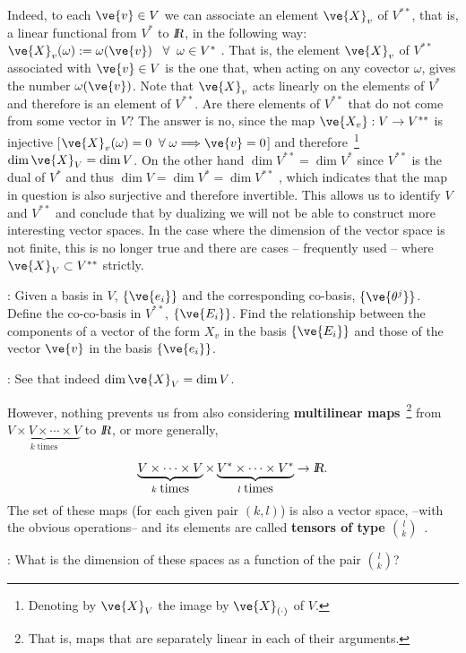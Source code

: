 Indeed, to each $\ve{v}\in V$ we can associate an element $\ve{
X}_v$ of
$V^{**}$, that is, a linear functional from $V^*$ to $\mbox{\sl {l$\!\!\!\;\:\!$R}}$, in the
following way: $\ve{X}_v(\omega):=\omega(\ve{v}) \;\;\;\forall
\;\;\omega\in V^{*}$ . That is, the element $\ve{X}_v$ of $V^{**}$
associated with $\ve{ v}\in V$ is the one that, when acting on any
covector $\omega$, gives the number $\omega (\ve{v})$. Note that $\ve{X}_v$ acts
linearly on the elements of $V^*$ and therefore is an element
of $V^{**}$. Are there elements of $V^{**}$ that do not come from some
vector in $V$? 
The answer is no, since the map  $\ve{X_v}:V\to V^{**}$ is
injective [$\ve{X}_v(\omega)=0\;\;\forall \; \omega\Longrightarrow \ve{v}=0$] and
therefore~\footnote{Denoting by $\ve{X}_V$ the image by $\ve{X}_{(\cdot)}$ 
of $V$.} $\dim \ve{X}_V = \dim V$.
On the other hand $\dim V^{**} = \dim V^*$ since $V^{**}$ is the dual of $V^*$ and thus 
$\dim V = \dim V^* = \dim V^{**}$ , which indicates that the map in question is also 
surjective and therefore invertible.
This allows us to identify
$V$ and $V^{**}$ and conclude that by dualizing we will not be able
to construct more interesting vector spaces. In the case where the dimension of the vector space is not finite, this is no longer true and there are cases -- frequently used -- where $\ve{X}_V \subset V^{**}$ strictly.
\espa

\ejer: Given a basis in $V$, $\{\ve{e_{i}}\}$ and the corresponding co-basis, $\{\ve{\theta^{j}}\}$.
Define the co-co-basis in $V^{**}$, $\{\ve{E_{i}}\}$. 
Find the relationship between the components of a vector of the form $X_{v}$ in the basis $\{\ve{E_{i}}\}$ and 
those of the vector $\ve{v}$ in the basis $\{\ve{e_{i}}\}$.

\ejer: See that indeed $\dim \ve{X}_V = \dim V$.

However, nothing prevents us from also considering 
{\bf multilinear maps}~\footnote{That is, maps that are separately linear in each 
of their arguments.} 
from $\underbrace{V\times V\times\cdots\times V}_{k\;\mbox{times}}$ to $\mbox{\sl {l$\!\!\!\;\:\!$R}}$,
or more generally,

\[
\underbrace{V\times\cdots\times V}_{k\;\mbox{times}}
\times\underbrace{ V^*\times \cdots\times V^*}_{l\;\mbox{times}} \to \mbox{\sl {l$\!\!\!\;\:\!$R}}.
\]
%
The set of these maps (for each given pair $(k,l)$) is also a vector 
space, --with the obvious operations-- and its elements are called
{\bf tensors of type ${l\choose k}$}~.

\ejer: What is the dimension of these spaces as a function of the pair ${l \choose k}$?

